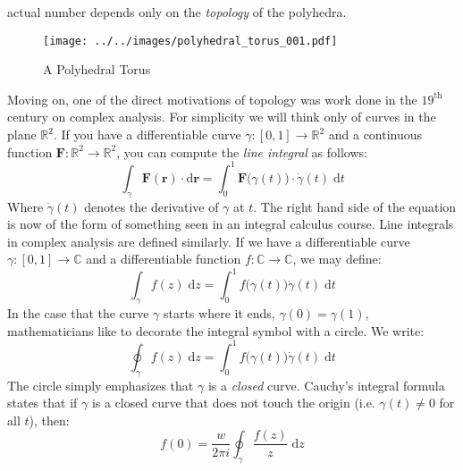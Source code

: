     actual number depends only on the \textit{topology} of the polyhedra.
    \begin{figure}
        \centering
        \texttt{[image: ../../images/polyhedral\_torus\_001.pdf]}
        \caption{A Polyhedral Torus}
        \label{fig:polyhedral_torus_001}
    \end{figure}
    \par\hfill\par
    Moving on, one of the direct motivations of topology was work done in the
    $19^{\textrm{th}}$ century on complex analysis. For simplicity we will
    think only of curves in the plane $\mathbb{R}^{2}$. If you have a
    differentiable curve $\gamma:[0,1]\rightarrow\mathbb{R}^{2}$ and a
    continuous function
    $\mathbf{F}:\mathbb{R}^{2}\rightarrow\mathbb{R}^{2}$, you can compute the
    \textit{line integral} as follows:
    \begin{equation}
        \int_{\gamma}\mathbf{F}(\mathbf{r})\cdot\textrm{d}\mathbf{r}
            =\int_{0}^{1}\mathbf{F}\big(\gamma(t)\big)\cdot
                \dot{\gamma}(t)\;\textrm{d}t
    \end{equation}
    Where $\dot{\gamma}(t)$ denotes the derivative of $\gamma$ at $t$.
    The right hand side of the equation is now of the form of something seen
    in an integral calculus course. Line integrals in complex analysis are
    defined similarly. If we have a differentiable curve
    $\gamma:[0,1]\rightarrow\mathbb{C}$ and a differentiable function
    $f:\mathbb{C}\rightarrow\mathbb{C}$, we may define:
    \begin{equation}
        \int_{\gamma}f(z)\;\textrm{d}z
            =\int_{0}^{1}f\big(\gamma(t)\big)\dot{\gamma}(t)\;\textrm{d}t
    \end{equation}
    In the case that the curve $\gamma$ starts where it ends,
    $\gamma(0)=\gamma(1)$, mathematicians like to decorate the integral symbol
    with a circle. We write:
    \begin{equation}
        \oint_{\gamma}f(z)\;\textrm{d}z=
            \int_{0}^{1}f\big(\gamma(t)\big)\dot{\gamma}(t)\;\textrm{d}t
    \end{equation}
    The circle simply emphasizes that $\gamma$ is a \textit{closed} curve.
    Cauchy's integral formula states that if $\gamma$ is a closed curve that
    does not touch the origin (i.e. $\gamma(t)\ne{0}$ for all $t$), then:
    \begin{equation}
        f(0)=\frac{w}{2\pi{i}}\oint_{\gamma}\frac{f(z)}{z}\;\textrm{d}z
    \end{equation}
